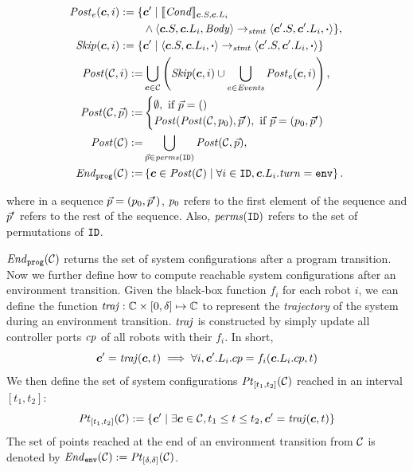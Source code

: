 \begin{mdframed}[
    skipabove=5pt, skipbelow=5pt,
    innertopmargin=0pt,
    innerleftmargin=0pt, innerrightmargin=0pt
]
\footnotesize
\newcommand{\Skip}{\mathit{Skip}\xspace}
\begin{align*}
    \Post_\Ev(\gconfig,i) := \{& \gconfig' \mid \eec{\EvCond}{\gconfig.S, \gconfig.\lconfig{i}} \\
      & \land \left\langle \gconfig.S, \gconfig.\lconfig{i}, \EvBody \right\rangle \stmtrule \left\langle \gconfig'.S, \gconfig'.\lconfig{i}, \EndEvent \right\rangle\}, \\
    \Skip(\gconfig,i) := \{& \gconfig' \mid \left\langle \gconfig.S, \gconfig.\lconfig{i}, \EndEvent \right\rangle \stmtrule \left\langle \gconfig'.S, \gconfig'.\lconfig{i}, \EndEvent \right\rangle \} \\
    \Post(\gset,i) := & \bigcup_{\gconfig\in\gset} \left(\Skip(\gconfig, i) \cup \bigcup_{\Ev \in \Event} \Post_\Ev(\gconfig, i) \right),\\
    \Post(\gset,\pvec) := &
        \begin{cases}
            \emptyset, \text{ if } \pvec=()\\
            \Post(\Post(\gset,\pinit),\pvec'), \text{ if } \pvec=(\pinit, \pvec')\\
        \end{cases}\\
    \Post(\gset) := & \bigcup_{\pvec\in \mathit{perms}(\UINS)} \Post(\gset,\pvec), \\
    \Final(\gset) := & \left\{ \gconfig\in \Post(\gset)\mid \forall i \in \UINS, \gconfig.\lconfig{i}.\turn = \env \right\}.
\end{align*}
\end{mdframed}
where in a sequence $\vec{p}=(p_0, \vec{p}')$, $p_0$ refers to the first element of the sequence and $\vec{p}'$ refers to the rest of the sequence.
Also, $\mathit{perms}(\texttt{ID})$ refers to the set of permutations of $\texttt{ID}$.

$\mathit{End}_{\mathtt{prog}}(\mathcal{C})$ returns the set of system configurations after a program transition.
Now we further define how to compute reachable system configurations after an environment transition.
Given the black-box function $f_i$ for each robot $i$,
we can define the function $\mathit{traj}: \mathbb{C} \times \left[0,\delta\right] \mapsto \mathbb{C}$ to represent the \emph{trajectory} of the system during an environment transition.
$\mathit{traj}$ is constructed by simply update all controller ports $\mathit{cp}$ of all robots with their $f_i$.
In short,
\[
\mathit{\boldsymbol{c}}' = \mathit{traj}(\mathit{\boldsymbol{c}}, t) \implies \forall i, \mathit{\boldsymbol{c}}'.L_{i}.cp = f_i(\mathit{\boldsymbol{c}}.L_{i}.cp, t)
\]
We then define the set of system configurations $\mathit{Pt}_{[t_1,t_2]}(\mathcal{C})$ reached in an interval $[t_1,t_2]$:
\[
\mathit{Pt}_{[t_1,t_2]}(\mathcal{C}) := \left\{\mathit{\boldsymbol{c}}' \mid \exists \mathit{\boldsymbol{c}}\in \mathcal{C}, t_1 \leq t\leq t_2 , \mathit{\boldsymbol{c}}' = \mathit{traj}(\mathit{\boldsymbol{c}},t)\right\}
\]
The set of points reached at the end of an environment transition from $\mathcal{C}$ is denoted by  $\mathit{End}_{\mathtt{env}}(\mathcal{C}) := \mathit{Pt}_{[\delta,\delta]}(\mathcal{C})$.

